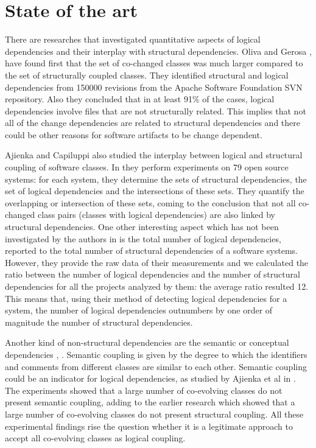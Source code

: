 \documentclass[a4paper,twoside]{article}
\begin{document}
\section{State of the art}
\label{sec:state}


There are researches that investigated quantitative aspects of logical dependencies and their interplay with structural dependencies. 
Oliva and Gerosa \cite{Oliva:2011:ISL:2067853.2068086}, \cite{DBLP:conf/issre/OlivaG15} have found first that the set of co-changed classes was much larger compared to the set of structurally coupled classes. They identified structural and logical dependencies from 150000 revisions from the Apache Software Foundation SVN repository. Also they concluded  that in at least 91\% of the cases, logical dependencies involve files that are not structurally related. This implies that not all of the change dependencies are related to structural dependencies and there could be other reasons for software artifacts to be change dependent.

Ajienka and Capiluppi also studied the interplay between logical and structural coupling of software classes. In \cite{DBLP:journals/jss/AjienkaC17} they  perform experiments on 79 open source systems: for each system, they determine the sets of structural dependencies, the set of logical dependencies and the intersections of these sets. They quantify the overlapping or intersection of these sets, coming to the conclusion that not all co-changed class pairs (classes with logical dependencies) are also linked by structural dependencies. One other interesting aspect which has not been investigated by the authors in \cite{DBLP:journals/jss/AjienkaC17}  is the total number of logical dependencies, reported to the total number of structural dependencies of a software systems. However, they provide the raw data of their measurements and we calculated the ratio between the number of logical dependencies and the number of structural dependencies for all the projects analyzed by them: the average ratio resulted 12.  This means that, using their method of detecting logical dependencies for a system, the number of logical dependencies outnumbers by one order of magnitude the number of structural dependencies. 


Another kind of non-structural dependencies are the semantic or conceptual dependencies \cite{Poshyvanyk2009}, \cite{posh2010}. Semantic coupling is given by the degree to which the identifiers
and comments from different classes are similar to each other. Semantic coupling could be an indicator for logical dependencies, as studied by Ajienka et al in \cite{DBLP:journals/ese/AjienkaCC18}. The experiments showed that a large number of co-evolving classes do not present semantic coupling, adding to the earlier research which showed that a large number of co-evolving classes do not present structural coupling. All these experimental findings rise the question whether it is a legitimate approach to accept all co-evolving classes as logical coupling.
\end{document}
